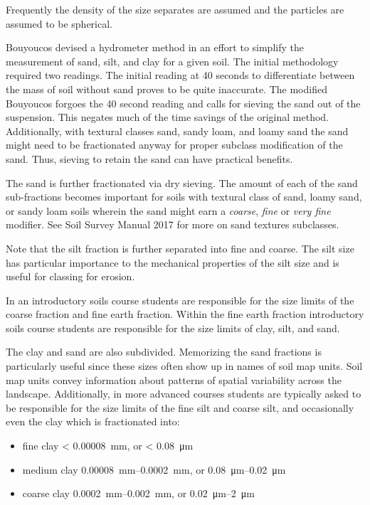 \documentclass[letterpaper, 12pt]{article}
\begin{document}
Frequently the density of the size separates are assumed and the particles are assumed to be spherical.

Bouyoucos devised a hydrometer method in an effort to simplify the measurement of sand, silt, and clay for a given soil. The initial methodology required two readings. The initial reading at 40 seconds to differentiate between the mass of soil without sand proves to be quite inaccurate. The modified Bouyoucos forgoes the 40 second reading and calls for sieving the sand out of the suspension. This negates much of the time savings of the original method. Additionally, with textural classes sand, sandy loam, and loamy sand the sand might need to be fractionated anyway for proper subclass modification of the sand. Thus, sieving to retain the sand can have practical benefits.

The sand is further fractionated via dry sieving. The amount of each of the sand sub-fractions becomes important for soils with textural class of sand, loamy sand, or sandy loam soils wherein the sand might earn a \textit{coarse}, \textit{fine} or \textit{very fine} modifier. See Soil Survey Manual 2017 for more on sand textures subclasses.

Note that the silt fraction is further separated into fine and coarse. The silt size has particular importance to the mechanical properties of the silt size and is useful for classing for erosion.

In an introductory soils course students are responsible for the size limits of the coarse fraction and fine earth fraction. Within the fine earth fraction introductory soils course students are responsible for the size limits of clay, silt, and sand.

The clay and sand are also subdivided. Memorizing the sand fractions is particularly useful since these sizes often show up in names of soil map units. Soil map units convey information about patterns of spatial variability across the landscape. Additionally, in more advanced courses students are typically asked to be responsible for the size limits of the fine silt and coarse silt, and occasionally even the clay which is fractionated into:
    
\begin{itemize}
    \item fine clay \qty{< 0.00008}{mm}, or \qty{< 0.08}{\micro\meter}
    \item medium clay \qtyrange{0.00008}{0.0002}{mm}, or \qtyrange{0.08}{0.02}{\micro\meter}
    \item coarse clay \qtyrange{0.0002}{0.002}{mm}, or \qtyrange{0.02}{2}{\micro\meter}
\end{itemize}
    
\end{document}
